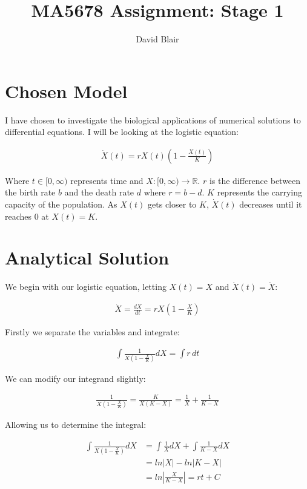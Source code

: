 \documentclass[]{report}
\title{MA5678 Assignment: Stage 1}
\author{David Blair}
\begin{document}
	\maketitle
	
	\section{Chosen Model}
	I have chosen to investigate the biological applications of numerical solutions to differential equations. I will be looking at the logistic equation: 
	
	\begin{align}
		\dot X(t) = rX(t)\left(1 - \frac{X(t)}{K}\right)	
		\label{eq:logistic_growth}	
	\end{align}

	Where $t \in [0, \infty)$ represents time and $X: [0, \infty) \rightarrow \mathbb{R}$. $r$ is the difference between the birth rate $b$ and the death rate $d$ where $r = b - d$. 
	$K$ represents the carrying capacity of the population. As $X(t)$ gets closer to $K$, $\dot X(t)$ decreases until it reaches 0 at $X(t) = K$.
	
	\section{Analytical Solution}
	We begin with our logistic equation, letting $X(t) = X$ and $\dot X(t) = \dot X$:
	
	\begin{align}
		\dot X = \frac{dX}{dt} = rX\left(1 - \frac{X}{K}\right)		
	\end{align}

	Firstly we separate the variables and integrate:
	
	\begin{align}
		\int\frac{1}{X\left(1 - \frac{X}{K}\right)} dX = \int r \hspace{2pt} dt
	\end{align}

	We can modify our integrand slightly:
	
	\begin{align}
		\frac{1}{X\left(1 - \frac{X}{K}\right)} = \frac{K}{X(K - X)} = \frac{1}{X} + \frac{1}{K - X}
	\end{align}

	Allowing us to determine the integral:
	
	\begin{align}
		\int\frac{1}{X\left(1 - \frac{X}{K}\right)} dX &= \int \frac{1}{X} dX + \int \frac{1}{K - X} dX \\
		&= ln|X| - ln|K - X| \\
		&= ln\left|\frac{X}{K - X}\right| = rt + C 
	\end{align}
	
\end{document}
